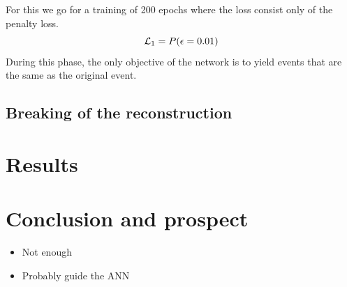\documentclass[../main.tex]{subfiles}
\begin{document}
For this we go for a training of 200 epochs where the loss consist only of the penalty loss.
\begin{equation}
  {\cal L}_1 = P(\epsilon = 0.01)
\end{equation}
During this phase, the only objective of the network is to yield events that are the same as the original event.

\subsection{Breaking of the reconstruction}
\label{sec:janne:results:break}

\section{Results}
\label{sec:janne:results}
\section{Conclusion and prospect}
\label{sec:janne:conclusion}
\begin{itemize}
  \item Not enough
  \item Probably guide the ANN
\end{itemize}
\end{document}
